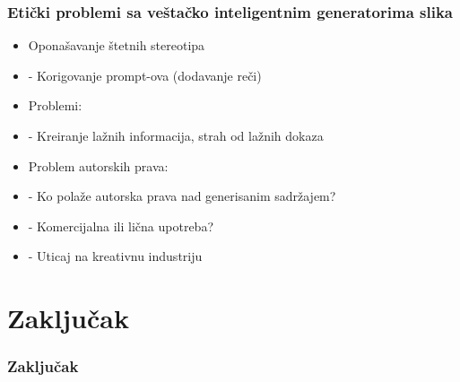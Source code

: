 \documentclass{beamer}
\begin{document}
\begin{frame}[fragile]\frametitle{Etički problemi sa veštačko inteligentnim generatorima slika}
	
	\begin{itemize}
		\item Oponašavanje štetnih stereotipa
        \item[]  - Korigovanje prompt-ova (dodavanje reči)
        \item Problemi:
        \item[] - Kreiranje lažnih informacija, strah od lažnih dokaza
        \item Problem autorskih prava:
		\item[] - Ko polaže autorska prava nad generisanim sadržajem?
		\item[] - Komercijalna ili lična upotreba?
		\item[] - Uticaj na kreativnu industriju
	\end{itemize}	
	
\end{frame}

\section{Zaključak} %

\begin{frame}[fragile]\frametitle{Zaključak}
	
\end{frame}
\end{document}
